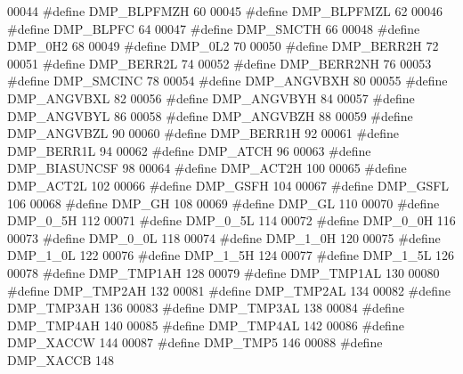 \begin{DoxyCode}
00044 \textcolor{preprocessor}{#define DMP\_BLPFMZH    60}
00045 \textcolor{preprocessor}{#define DMP\_BLPFMZL    62}
00046 \textcolor{preprocessor}{#define DMP\_BLPFC    64}
00047 \textcolor{preprocessor}{#define DMP\_SMCTH    66}
00048 \textcolor{preprocessor}{#define DMP\_0H2    68}
00049 \textcolor{preprocessor}{#define DMP\_0L2    70}
00050 \textcolor{preprocessor}{#define DMP\_BERR2H    72}
00051 \textcolor{preprocessor}{#define DMP\_BERR2L    74}
00052 \textcolor{preprocessor}{#define DMP\_BERR2NH    76}
00053 \textcolor{preprocessor}{#define DMP\_SMCINC    78}
00054 \textcolor{preprocessor}{#define DMP\_ANGVBXH    80}
00055 \textcolor{preprocessor}{#define DMP\_ANGVBXL    82}
00056 \textcolor{preprocessor}{#define DMP\_ANGVBYH    84}
00057 \textcolor{preprocessor}{#define DMP\_ANGVBYL    86}
00058 \textcolor{preprocessor}{#define DMP\_ANGVBZH    88}
00059 \textcolor{preprocessor}{#define DMP\_ANGVBZL    90}
00060 \textcolor{preprocessor}{#define DMP\_BERR1H    92}
00061 \textcolor{preprocessor}{#define DMP\_BERR1L    94}
00062 \textcolor{preprocessor}{#define DMP\_ATCH    96}
00063 \textcolor{preprocessor}{#define DMP\_BIASUNCSF    98}
00064 \textcolor{preprocessor}{#define DMP\_ACT2H    100}
00065 \textcolor{preprocessor}{#define DMP\_ACT2L    102}
00066 \textcolor{preprocessor}{#define DMP\_GSFH    104}
00067 \textcolor{preprocessor}{#define DMP\_GSFL    106}
00068 \textcolor{preprocessor}{#define DMP\_GH    108}
00069 \textcolor{preprocessor}{#define DMP\_GL    110}
00070 \textcolor{preprocessor}{#define DMP\_0\_5H    112}
00071 \textcolor{preprocessor}{#define DMP\_0\_5L    114}
00072 \textcolor{preprocessor}{#define DMP\_0\_0H    116}
00073 \textcolor{preprocessor}{#define DMP\_0\_0L    118}
00074 \textcolor{preprocessor}{#define DMP\_1\_0H    120}
00075 \textcolor{preprocessor}{#define DMP\_1\_0L    122}
00076 \textcolor{preprocessor}{#define DMP\_1\_5H    124}
00077 \textcolor{preprocessor}{#define DMP\_1\_5L    126}
00078 \textcolor{preprocessor}{#define DMP\_TMP1AH    128}
00079 \textcolor{preprocessor}{#define DMP\_TMP1AL    130}
00080 \textcolor{preprocessor}{#define DMP\_TMP2AH    132}
00081 \textcolor{preprocessor}{#define DMP\_TMP2AL    134}
00082 \textcolor{preprocessor}{#define DMP\_TMP3AH    136}
00083 \textcolor{preprocessor}{#define DMP\_TMP3AL    138}
00084 \textcolor{preprocessor}{#define DMP\_TMP4AH    140}
00085 \textcolor{preprocessor}{#define DMP\_TMP4AL    142}
00086 \textcolor{preprocessor}{#define DMP\_XACCW    144}
00087 \textcolor{preprocessor}{#define DMP\_TMP5    146}
00088 \textcolor{preprocessor}{#define DMP\_XACCB    148}

\end{DoxyCode}
